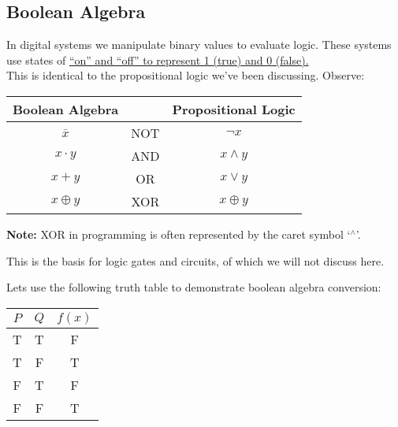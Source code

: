 
\subsection{Boolean Algebra}

In digital systems we manipulate binary values to evaluate logic. These systems use
states of \underline{``on'' and ``off'' to represent 1 (true) and 0 (false).}\\

\noindent
This is identical to the propositional logic we've been discussing. Observe:\\
\begin{center}
    \begin{tabular}{c c c}
        Boolean Algebra &     & Propositional Logic \\
        \hline
        $\bar{x}$       & NOT & $\neg x$            \\
        $x \cdot y$     & AND & $x \land y$         \\
        $x + y$         & OR  & $x \lor y$          \\
        $x \oplus y$    & XOR & $x \oplus y$        \\
        \hline
    \end{tabular}
\end{center}

\begin{Note}
    \textbf{Note:} XOR in programming is often represented by the caret symbol `$^\wedge $'.
\end{Note}

\noindent
This is the basis for logic gates and circuits, of which we will not discuss here.\\

\newpage

\noindent
Lets use the following truth table to demonstrate boolean algebra conversion:\\
\begin{center}
    \begin{tabular}{|c|c|c|}
        \hline
        \rowcolor{OliveGreen!10}
        $P$ & $Q$ & $f(x)$ \\
        \hline
        T   & T   & F      \\
        T   & F   & T      \\
        F   & T   & F      \\
        F   & F   & T      \\
        \hline
    \end{tabular}
\end{center}

